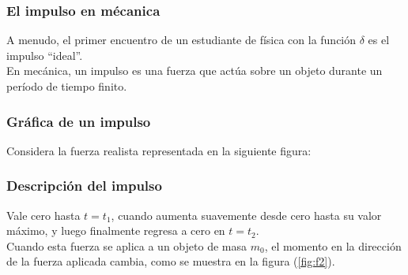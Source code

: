 \documentclass[12pt]{beamer}
\begin{document}
\begin{frame}
\frametitle{El impulso en mécanica}
A menudo, el primer encuentro de un estudiante de física con la función $\delta$ es el impulso \enquote{ideal}.
\\
\bigskip
\pause
En mecánica, un impulso es una fuerza que actúa sobre un objeto durante un período de tiempo finito.
\end{frame}
\begin{frame}
\frametitle{Gráfica de un impulso}
Considera la fuerza realista representada en la siguiente figura:
\pause
\begin{figure}[H]
    \centering
\end{figure}
\end{frame}
\begin{frame}
\frametitle{Descripción del impulso}
Vale cero hasta $t = t_{1}$, cuando aumenta suavemente desde cero hasta su valor máximo, y luego finalmente regresa a cero en $t = t_{2}$.
\\
\bigskip
\pause
Cuando esta fuerza se aplica a un objeto de masa $m_{0}$, el momento en la dirección de la fuerza aplicada cambia, como se muestra en la figura (\ref{fig:f2}).
\end{frame}
\end{document}
